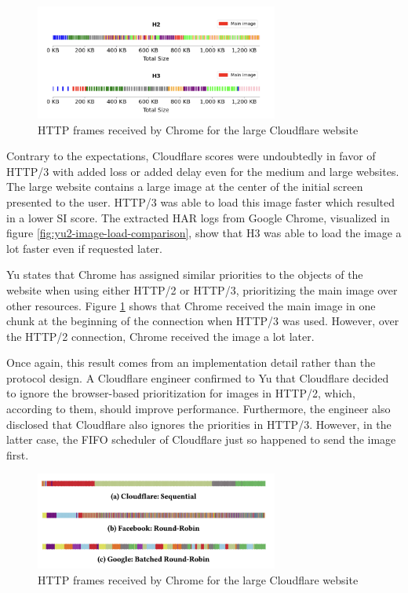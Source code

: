 \documentclass[conference]{IEEEtran}
\begin{document}
\begin{figure}[htbp]
  \begin{center}
  \includegraphics[width=8cm,keepaspectratio]{images/Yu2/Chrome HTTP frames.png}
  \caption{HTTP frames received by Chrome for the large Cloudflare website}
  \label{fig:yu2-chrome-http-frames}
  \end{center}
\end{figure}

Contrary to the expectations, Cloudflare scores were undoubtedly in favor of HTTP/3 with added loss or added delay even for the medium and large websites. The large website contains a large image at the center of the initial screen presented to the user. HTTP/3 was able to load this image faster which resulted in a lower SI score. The extracted HAR logs from Google Chrome, visualized in figure \ref{fig:yu2-image-load-comparison}, show that H3 was able to load the image a lot faster even if requested later. 

Yu states that Chrome has assigned similar priorities to the objects of the website when using either HTTP/2 or HTTP/3, prioritizing the main image over other resources. Figure \ref{fig:yu2-chrome-http-frames} shows that Chrome received the main image in one chunk at the beginning of the connection when HTTP/3 was used. However, over the HTTP/2 connection, Chrome received the image a lot later. 

Once again, this result comes from an implementation detail rather than the protocol design. A Cloudflare engineer confirmed to Yu that Cloudflare decided to ignore the browser-based prioritization for images in HTTP/2, which, according to them, should improve performance. Furthermore, the engineer also disclosed that Cloudflare also ignores the priorities in HTTP/3. However, in the latter case, the FIFO scheduler of Cloudflare just so happened to send the image first.

\begin{figure}[htbp]
  \begin{center}
  \includegraphics[width=8cm,keepaspectratio]{images/Yu2/HTTP3 multiplexing strategies.png}
  \caption{HTTP frames received by Chrome for the large Cloudflare website}
  \label{fig:yu2-multiplexing-strategies}
  \end{center}
\end{figure}
\end{document}
